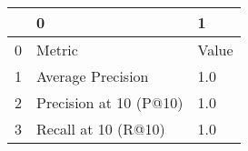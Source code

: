 \begin{tabular}{lll}
\toprule
{} &                       0 &      1 \\
\midrule
0 &                  Metric &  Value \\
1 &       Average Precision &    1.0 \\
2 &  Precision at 10 (P@10) &    1.0 \\
3 &     Recall at 10 (R@10) &    1.0 \\
\bottomrule
\end{tabular}
